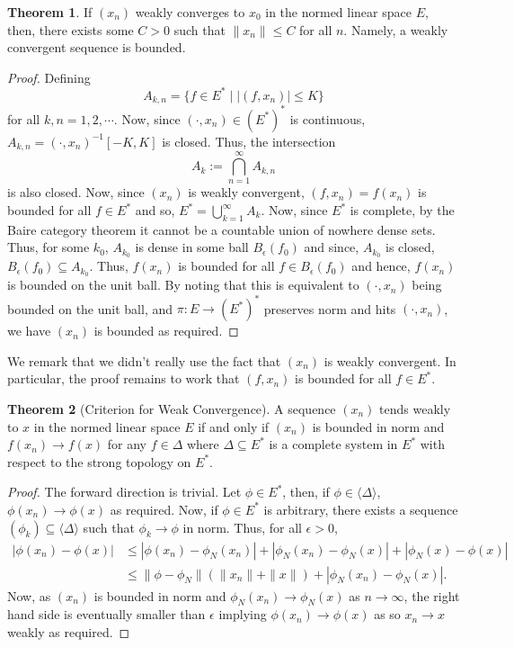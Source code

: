 \documentclass[]{article}
\theoremstyle{definition}
\newtheorem{theorem}{Theorem}
\theoremstyle{definition}
\begin{document}
\begin{theorem}
  If \((x_n)\) weakly converges to \(x_0\) in the normed linear space \(E\), 
  then, there exists some \(C > 0\) such that \(\|x_n\| \le C\) for all \(n\). 
  Namely, a weakly convergent sequence is bounded.
\end{theorem}
\begin{proof}
  Defining 
  \[A_{k,n} = \{f \in E^* \mid |(f, x_n)| \le K\}\]
  for all \(k, n = 1, 2, \cdots\). Now, since \((\cdot, x_n) \in (E^*)^*\) 
  is continuous, \(A_{k, n} = (\cdot, x_n)^{-1}[-K, K]\) is closed. 
  Thus, the intersection 
  \[A_k := \bigcap_{n = 1}^\infty A_{k, n}\]
  is also closed. Now, since \((x_n)\) is weakly convergent, 
  \((f, x_n) = f(x_n)\) is bounded for all \(f \in E^*\) and so,
  \(E^* = \bigcup_{k = 1}^\infty A_k\). Now, since \(E^*\) is complete, 
  by the Baire category theorem it cannot be a countable union of nowhere 
  dense sets. Thus, for some \(k_0\), \(A_{k_0}\) is dense in some ball 
  \(B_{\epsilon}(f_0)\) and since, \(A_{k_0}\) is closed, 
  \(B_{\epsilon}(f_0) \subseteq A_{k_0}\). Thus, \(f(x_n)\) is bounded 
  for all \(f \in B_{\epsilon}(f_0)\) and hence, \(f(x_n)\) is bounded on 
  the unit ball. By noting that this is equivalent to 
  \((\cdot, x_n)\) being bounded on the unit ball, and \(\pi : E \to (E^*)^*\) 
  preserves norm and hits \((\cdot, x_n)\), we have \((x_n)\) is bounded 
  as required.
\end{proof}

We remark that we didn't really use the fact that \((x_n)\) is weakly convergent. 
In particular, the proof remains to work that \((f, x_n)\) is bounded for all 
\(f \in E^*\).

\begin{theorem}[Criterion for Weak Convergence]
  A sequence \((x_n)\) tends weakly to \(x\) in the normed linear space \(E\) 
  if and only if \((x_n)\) is bounded in norm and \(f(x_n) \to f(x)\) for any 
  \(f \in \Delta\) where \(\Delta \subseteq E^*\) is a complete system in 
  \(E^*\) with respect to the strong topology on \(E^*\).
\end{theorem}
\begin{proof}
  The forward direction is trivial. Let \(\phi \in E^*\), then, if 
  \(\phi \in \langle \Delta \rangle\), \(\phi(x_n) \to \phi(x)\) as required. 
  Now, if \(\phi \in E^*\) is arbitrary, there exists a sequence 
  \((\phi_k) \subseteq \langle \Delta \rangle\) such that \(\phi_k \to \phi\) 
  in norm. Thus, for all \(\epsilon > 0\), 
  \[\begin{split}
    |\phi(x_n) - \phi(x)| & \le 
      |\phi(x_n) - \phi_N(x_n)| + |\phi_N(x_n) - \phi_N(x)| + 
      |\phi_N(x) - \phi(x)|\\
    & \le \|\phi - \phi_N\| (\|x_n\| + \|x\|) + 
    |\phi_N(x_n) - \phi_N(x)|.
    \end{split}\]
  Now, as \((x_n)\) is bounded in norm and \(\phi_N(x_n) \to \phi_N(x)\) as 
  \(n \to \infty\), the right hand side is eventually smaller than \(\epsilon\)
  implying \(\phi(x_n) \to \phi(x)\) as so \(x_n \to x\) weakly as required.
\end{proof}
\end{document}
